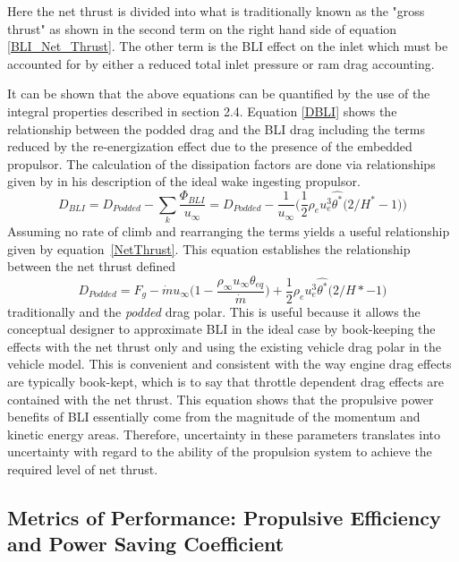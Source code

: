 \documentclass[12pt]{gatech-thesis}
\begin{document}
Here the net thrust is divided into what is traditionally known as the "gross thrust" as shown in the second term on the right hand side of equation \ref{BLI_Net_Thrust}.  The other term is the BLI effect on the inlet which must be accounted for by either a reduced total inlet pressure or ram drag accounting.

It can be shown that the above equations can be quantified by the use of the integral properties described in section 2.4.  Equation \ref{DBLI} shows the relationship between the podded drag and the BLI drag including the terms reduced by the re-energization effect due to the presence of the embedded propulsor.  The calculation of the dissipation factors are done via relationships given by \cite{Drela2009} in his description of the ideal wake ingesting propulsor.  
    \begin{equation}D_{BLI} = D_{Podded}-\displaystyle\sum_{k}\frac{\Phi_{BLI}}{u_\infty} = D_{Podded} - \frac{1}{u_\infty}\Big(\frac{1}{2}\rho_e u_e^3 \hat{\theta^*}\Big(2/H^*-1\Big)\Big) \label{DBLI}\end{equation}
    Assuming no rate of climb and rearranging the terms yields a useful relationship given by equation~\ref{NetThrust}.  This equation establishes the relationship between the net thrust defined
    \begin{equation}D_{Podded} = F_g - \dot{m}u_\infty\Big(1-\frac{\rho_\infty u_\infty \theta_{eq}}{\dot{m}}\Big)+\frac{1}{2}\rho_e u_e^3 \hat{\theta^*}\Big(2/H*-1\Big)\label{NetThrust}\end{equation}
    traditionally and the \emph{podded} drag polar.  This is useful because it allows the conceptual designer to approximate BLI in the ideal case by book-keeping the effects with the net thrust only and using the existing vehicle drag polar in the vehicle model.  This is convenient and consistent with the way engine drag effects are typically book-kept, which is to say that throttle dependent drag effects are contained with the net thrust.  This equation shows that the propulsive power benefits of BLI essentially come from the magnitude of the momentum and kinetic energy areas.  Therefore, uncertainty in these parameters translates into uncertainty with regard to the ability of the propulsion system to achieve the required level of net thrust.

\subsection{Metrics of Performance:  Propulsive Efficiency and Power Saving Coefficient}
\end{document}
